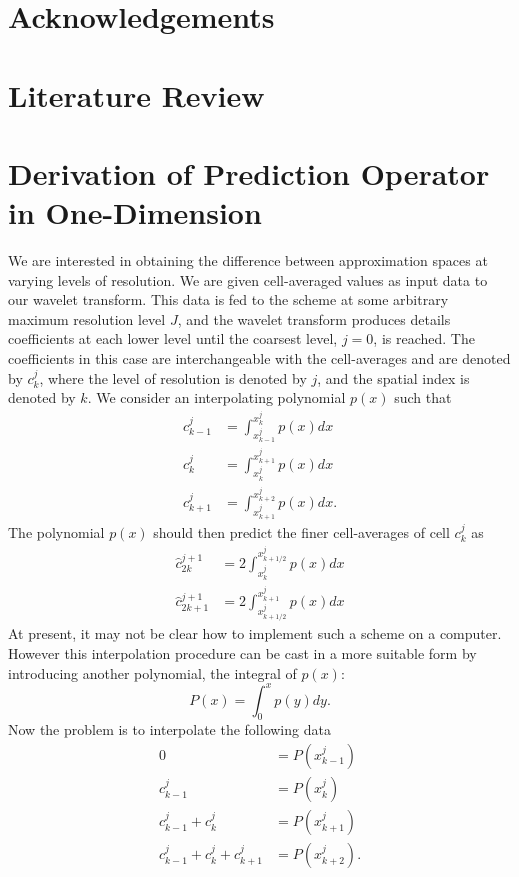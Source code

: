 \documentclass{article}
\begin{document}
\section{Acknowledgements}

\appendix

\section{Literature Review}

\section{Derivation of Prediction Operator in One-Dimension}
We are interested in obtaining the difference between approximation spaces at varying levels of resolution. We 
are given cell-averaged values as input data to our wavelet transform. This data is fed to the scheme at some arbitrary maximum
resolution level $J$, and the wavelet transform produces details coefficients at each lower level until the coarsest level,
$j=0$, is reached. The coefficients in this case are interchangeable with the cell-averages and are denoted by $c^{j}_{k}$,
where the level of resolution is denoted by $j$, and the spatial index is denoted by $k$. We consider an interpolating
polynomial $p(x)$ such that 
\begin{align}
    c^{j}_{k-1} &= \int_{x^{j}_{k-1}}^{x^{j}_{k}} p(x) dx \\
    c^{j}_{k} &= \int_{x^{j}_{k}}^{x^{j}_{k+1}} p(x) dx \\
    c^{j}_{k+1} &= \int_{x^{j}_{k+1}}^{x^{j}_{k+2}} p(x) dx.
\end{align}
The polynomial $p(x)$ should then predict the finer cell-averages of cell $c^{j}_{k}$ as
\begin{align}
    \hat{c}^{j+1}_{2k} &= 2 \int_{x^{j}_{k}}^{x^{j}_{k+1/2}} p(x) dx \\
    \hat{c}^{j+1}_{2k+1} &= 2 \int_{x^{j}_{k+1/2}}^{x^{j}_{k+1}} p(x) dx
\end{align}
At present, it may not be clear how to implement such a scheme on a computer. However this interpolation procedure
can be cast in a more suitable form by introducing another polynomial, the integral of $p(x)$:
\begin{equation}
	P(x) = \int_{0}^{x} p(y) dy.
\end{equation}
Now the problem is to interpolate the following data
\begin{align}
    0 &= P(x^{j}_{k-1}) \\
    c^{j}_{k-1} &= P(x^{j}_{k}) \\
    c^{j}_{k-1} + c^{j}_{k} &= P(x^{j}_{k+1}) \\
    c^{j}_{k-1} + c^{j}_{k} + c^{j}_{k+1} &= P(x^{j}_{k+2}).
\end{align}
\end{document}
